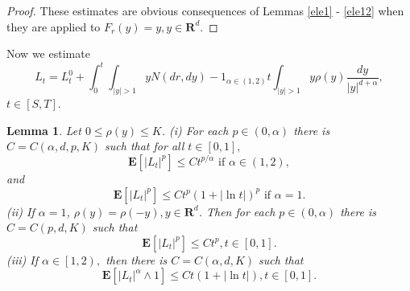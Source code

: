 \documentclass[11pt]{amsart}
\theoremstyle{plain}
\newtheorem{lemma}{Lemma}
\numberwithin{equation}{section}
\begin{document}
\begin{proof}
These estimates are obvious consequences of Lemmas \ref{ele1} - \ref{ele12}
when they are applied to $F_{r}\left( y\right) =y,y\in \mathbf{R}^{d}.$
\end{proof}

Now we estimate 
\begin{equation*}
L_{t}=L_{t}^{0}+\int_{0}^{t}\int_{\left\vert y\right\vert >1}yN\left(
dr,dy\right) -1_{\alpha \in (1,2)}t\int_{\left\vert y\right\vert >1}y\rho
\left( y\right) \frac{dy}{\left\vert y\right\vert ^{d+\alpha }},
\end{equation*}$t\in \left[ S,T\right]$.

\begin{lemma}
\label{c2}Let $0\leq \rho \left( y\right) \leq K$.\newline
(i) For each $p\in \left( 0,\alpha \right) $ there is $C=C\left( \alpha
,d,p,K\right) $ such that for all $t\in \left[ 0,1\right] ,$\begin{equation*}
\mathbf{E}\left[ \left\vert L_{t}\right\vert ^{p}\right] \leq Ct^{p/\alpha }\text{ if }\alpha \in \left( 1,2\right) ,
\end{equation*}and\begin{equation*}
\mathbf{E}\left[ \left\vert L_{t}\right\vert ^{p}\right] \leq Ct^{p}\left(
1+\left\vert \ln t\right\vert \right) ^{p}\text{ if }\alpha =1.
\end{equation*}(ii) If $\alpha =1$, $\rho \left( y\right) =\rho \left( -y\right) ,y\in 
\mathbf{R}^{d}$. Then for each $p\in \left( 0,\alpha \right) $ there is $C=C(p,d,K)$ such that 
\begin{equation*}
\mathbf{E}\left[ \left\vert L_{t}\right\vert ^{p}\right] \leq Ct^{p},t\in \left[ 0,1\right] .
\end{equation*}(iii) If $\alpha \in \left[ 1,2\right) ,$ then there is $C=C\left( \alpha
,d,K\right) $ such that\begin{equation*}
\mathbf{E}\left[ \left\vert L_{t}\right\vert ^{\alpha }\wedge 1\right] \leq
Ct(1+\left\vert \ln t\right\vert ),t\in \left[ 0,1\right] .
\end{equation*}
\end{lemma}
\end{document}
